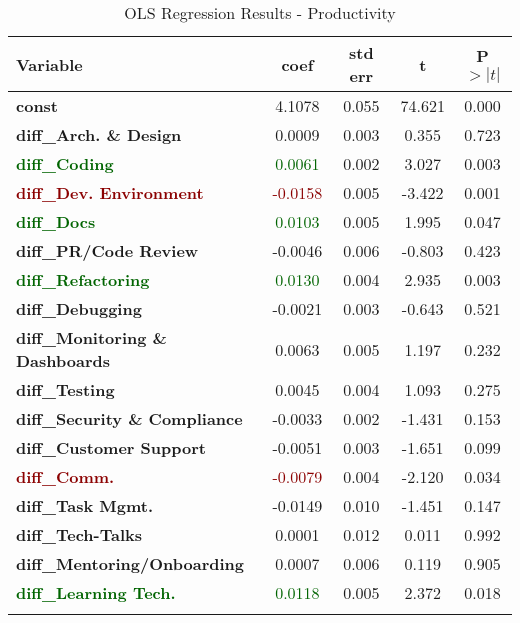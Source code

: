 \begin{table}
\centering
\caption{OLS Regression Results - Productivity }
\begin{tabular}{lcccc}
\toprule
\textbf{Variable} & \textbf{coef} & \textbf{std err} & \textbf{t} & \textbf{P}\( > |t| \) \\
\midrule
\textbf{const}                          & 4.1078 & 0.055  & 74.621  & 0.000  \\
\textbf{diff\_Arch. \& Design}          & 0.0009 & 0.003  & 0.355   & 0.723  \\
\textcolor{darkgreen}{\textbf{diff\_Coding}}                   & \textcolor{darkgreen}{0.0061} & 0.002  & 3.027   & 0.003  \\
\textcolor{darkred}{\textbf{diff\_Dev. Environment}}         & \textcolor{darkred}{-0.0158} & 0.005  & -3.422  & 0.001  \\
\textcolor{darkgreen}{\textbf{diff\_Docs}}                     & \textcolor{darkgreen}{0.0103} & 0.005  & 1.995   & 0.047  \\
\textbf{diff\_PR/Code Review}           & -0.0046 & 0.006  & -0.803  & 0.423  \\
\textcolor{darkgreen}{\textbf{diff\_Refactoring}}              & \textcolor{darkgreen}{0.0130} & 0.004  & 2.935   & 0.003  \\
\textbf{diff\_Debugging}                & -0.0021 & 0.003  & -0.643  & 0.521  \\
\textbf{diff\_Monitoring \& Dashboards} & 0.0063 & 0.005  & 1.197   & 0.232  \\
\textbf{diff\_Testing}                  & 0.0045 & 0.004  & 1.093   & 0.275  \\
\textbf{diff\_Security \& Compliance}   & -0.0033 & 0.002  & -1.431  & 0.153  \\
\textbf{diff\_Customer Support}          & -0.0051 & 0.003  & -1.651  & 0.099  \\
\textcolor{darkred}{\textbf{diff\_Comm.}}                    & \textcolor{darkred}{-0.0079} & 0.004  & -2.120  & 0.034  \\
\textbf{diff\_Task Mgmt.}               & -0.0149 & 0.010  & -1.451  & 0.147  \\
\textbf{diff\_Tech-Talks}               & 0.0001 & 0.012  & 0.011   & 0.992  \\
\textbf{diff\_Mentoring/Onboarding}     & 0.0007 & 0.006  & 0.119   & 0.905  \\
\textcolor{darkgreen}{\textbf{diff\_Learning Tech.}}           & \textcolor{darkgreen}{0.0118} & 0.005  & 2.372   & 0.018  \\
\bottomrule
\label{tab:regression_results_productivity}
\end{tabular}
\end{table}


